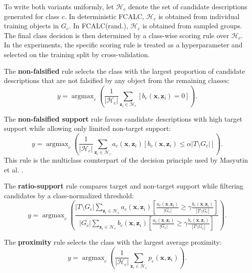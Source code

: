 \documentclass[a4paper,fleqn]{cas-sc}
\DeclareMathOperator*{\argmax}{argmax}
\begin{document}
To write both variants uniformly, let \(\mathcal{H}_c\) denote the set of candidate descriptions generated for class \(c\). In deterministic FCALC, \(\mathcal{H}_c\) is obtained from individual training objects in \(G_c\). In FCALC(rand.), \(\mathcal{H}_c\) is obtained from sampled groups. The final class decision is then determined by a class-wise scoring rule over \(\mathcal{H}_c\). In the experiments, the specific scoring rule is treated as a hyperparameter and selected on the training split by cross-validation.

The \textbf{non-falsified} rule selects the class with the largest proportion of candidate descriptions that are not falsified by any object from the remaining classes:
\begin{equation}
    y = \argmax_c \left(
    \frac{1}{|\mathcal{H}_c|}
    \sum_{\mathbf{z}_i \in \mathcal{H}_c} [b_c(\mathbf{x},\mathbf{z}_i) = 0]
    \right).
\end{equation}

The \textbf{non-falsified support} rule favors candidate descriptions with high target support while allowing only limited non-target support:
\begin{equation}
    y = \argmax_c \left(
    \frac{1}{|\mathcal{H}_c|}
    \sum_{\mathbf{z}_i \in \mathcal{H}_c}
    a_c(\mathbf{x},\mathbf{z}_i) [b_c(\mathbf{x},\mathbf{z}_i) \leq \alpha |T \setminus G_c|]
    \right).
\end{equation}
This rule is the multiclass counterpart of the decision principle used by Masyutin et al. \cite{masyutin2015lazy}.

The \textbf{ratio-support} rule compares target and non-target support while filtering candidates by a class-normalized threshold:
\begin{equation}
    y = \argmax_c \left(
    \frac{|T \setminus G_c|
    \sum\limits_{\mathbf{z}_i \in \mathcal{H}_c}
    a_c(\mathbf{x},\mathbf{z}_i) \left[\frac{a_c(\mathbf{x},\mathbf{z}_i)}{|G_c|} \geq \gamma \frac{b_c(\mathbf{x},\mathbf{z}_i)}{|T \setminus G_c|}\right]}
    {|G_c|
    \sum\limits_{\mathbf{z}_i \in \mathcal{H}_c}
    b_c(\mathbf{x},\mathbf{z}_i) \left[\frac{a_c(\mathbf{x},\mathbf{z}_i)}{|G_c|} \geq \gamma \frac{b_c(\mathbf{x},\mathbf{z}_i)}{|T \setminus G_c|}\right]}
    \right).
\end{equation}

The \textbf{proximity} rule selects the class with the largest average proximity:
\begin{equation}
    y = \argmax_c \left(
    \frac{1}{|\mathcal{H}_c|}
    \sum_{\mathbf{z}_i \in \mathcal{H}_c} p_c(\mathbf{x},\mathbf{z}_i)
    \right).
\end{equation}
\end{document}
